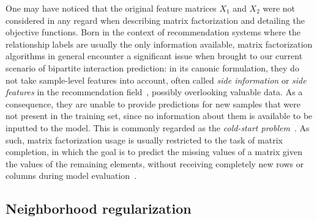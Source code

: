 \begin{apendicesenv}
% 

One may have noticed that the original feature matrices $X_1$ and $X_2$ were not considered in any regard when describing matrix factorization and detailing the objective functions.
Born in the context of recommendation systems where the relationship labels are usually the only information available, matrix factorization algorithms in general encounter a significant issue when brought to our current scenario of bipartite interaction prediction:
in its canonic formulation, they do not take sample-level features into account, often called \emph{side information} or \emph{side features} in the recommendation field~\cite{rafailidis2016modeling}, possibly overlooking valuable data. As a consequence, they are unable to provide predictions for new samples that were not present in the training set, since no information about them is available to be inputted to the model. This is commonly regarded as the \emph{cold-start problem}~\cite{lu2012recommender}. As such, matrix factorization usage is usually restricted to the task of matrix completion, in which the goal is to predict the missing values of a matrix given the values of the remaining elements, without receiving completely new rows or columns during model evaluation~\cite{lu2012recommender}.


\subsection{Neighborhood regularization}
\label{sec:neighborhood regularization}


\end{apendicesenv}
